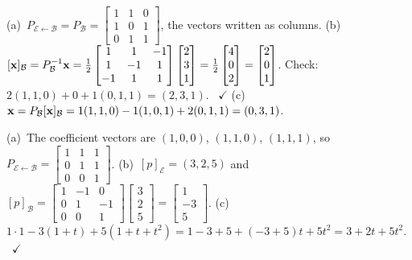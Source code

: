 \documentclass[11pt]{article}
\begin{document}
\begin{description}[leftmargin=0pt,itemsep=5pt]
  \item[Knowledge Check \ref{kc:std}.] (a)~$P_{\mathcal{E}\leftarrow\mathcal{B}}=P_{\mathcal{B}}=\begin{bmatrix}1&1&0\\1&0&1\\0&1&1\end{bmatrix}$, the vectors written as columns. (b)~$[\mathbf{x}]_{\mathcal{B}}=P_{\mathcal{B}}^{-1}\mathbf{x}=\tfrac12\begin{bmatrix}1&1&-1\\1&-1&1\\-1&1&1\end{bmatrix}\begin{bmatrix}2\\3\\1\end{bmatrix}=\tfrac12\begin{bmatrix}4\\0\\2\end{bmatrix}=\begin{bmatrix}2\\0\\1\end{bmatrix}$. Check: $2(1,1,0)+0+1(0,1,1)=(2,3,1)$. \ $\checkmark$ (c)~$\mathbf{x}=P_{\mathcal{B}}[\mathbf{x}]_{\mathcal{B}}=1(1,1,0)-1(1,0,1)+2(0,1,1)=(0,3,1)$.
  \item[Knowledge Check \ref{kc:poly}.] (a)~The coefficient vectors are $(1,0,0)$, $(1,1,0)$, $(1,1,1)$, so $P_{\mathcal{E}\leftarrow\mathcal{B}}=\begin{bmatrix}1&1&1\\0&1&1\\0&0&1\end{bmatrix}$. (b)~$[p]_{\mathcal{E}}=(3,2,5)$ and $[p]_{\mathcal{B}}=\begin{bmatrix}1&-1&0\\0&1&-1\\0&0&1\end{bmatrix}\begin{bmatrix}3\\2\\5\end{bmatrix}=\begin{bmatrix}1\\-3\\5\end{bmatrix}$. (c)~$1\cdot1-3(1+t)+5(1+t+t^2)=1-3+5+(-3+5)t+5t^2=3+2t+5t^2$. \ $\checkmark$

\end{description}
\end{document}
